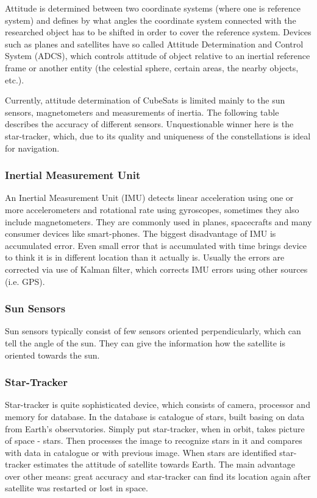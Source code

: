 \documentclass[12pt,a4paper,oneside]{article}
\begin{document}
Attitude is determined between two coordinate systems (where one is reference system) and defines by what angles the coordinate system connected with the researched object has to be shifted in order to cover the reference system.
Devices such as planes and satellites have so called Attitude Determination and Control System (ADCS), which controls attitude of object relative to an inertial reference frame or another entity (the celestial sphere, certain areas, the nearby objects, etc.).

Currently, attitude determination of CubeSats is limited mainly to the sun sensors, magnetometers and measurements of inertia. The following table describes the accuracy of different sensors. Unquestionable winner here is the star-tracker, which, due to its quality and uniqueness of the constellations is ideal for navigation. 

\subsubsection{Inertial Measurement Unit}
An Inertial Measurement Unit (IMU) detects linear acceleration using one or more accelerometers and rotational rate using gyroscopes, sometimes they also include magnetometers. They are commonly used in planes, spacecrafts and many consumer devices like smart-phones. The biggest disadvantage of IMU is accumulated error. Even small error that is accumulated with time brings device to think it is in different location than it actually is. Usually the errors are corrected via use of Kalman filter, which corrects IMU errors using other sources (i.e. GPS).
\subsubsection{Sun Sensors}
Sun sensors typically consist of few sensors oriented perpendicularly, which can tell the angle of the sun. They can give the information how the satellite is oriented towards the sun.
\subsubsection{Star-Tracker}
Star-tracker is quite sophisticated device, which consists of camera, processor and memory for database. In the database is catalogue of stars, built basing on data from Earth's observatories. Simply put star-tracker, when in orbit, takes picture of space - stars. Then processes the image to recognize stars in it and compares with data in catalogue or with previous image. When stars are identified star-tracker estimates the attitude of satellite towards Earth. The main advantage over other means: great accuracy and star-tracker can find its location again after satellite was restarted or lost in space.
\end{document}
